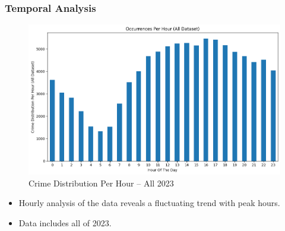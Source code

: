 \documentclass{beamer}
\begin{document}
\begin{frame}
    \frametitle{Temporal Analysis}
    \begin{minipage}[c]{0.7\textwidth}
        \begin{figure}
            \centering
            \includegraphics[width=\linewidth]{Figures/Crime Distribution Per Hour (All Dataset).png}
            \caption{Crime Distribution Per Hour -- All 2023}
        \end{figure}
    \end{minipage}\hfill
    \begin{minipage}[c]{0.3\textwidth}
        {\scriptsize %
            \begin{itemize}
                \item Hourly analysis of the data reveals a fluctuating trend with peak hours.
                \item Data includes all of 2023.
            \end{itemize}
        }
    \end{minipage}

\end{frame}

\end{document}
